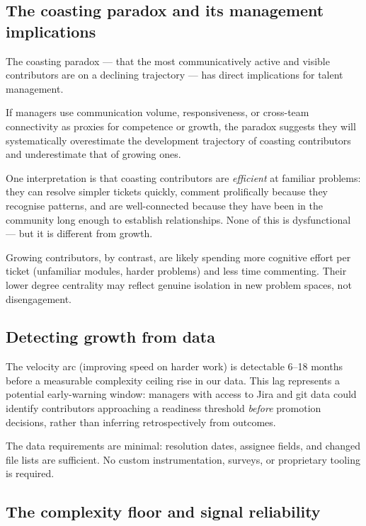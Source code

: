 \documentclass[12pt,a4paper]{article}
\begin{document}
\subsection{The coasting paradox and its management implications}

The coasting paradox --- that the most communicatively active and
visible contributors are on a declining trajectory --- has direct
implications for talent management.

If managers use communication volume, responsiveness, or
cross-team connectivity as proxies for competence or growth,
the paradox suggests they will systematically overestimate the
development trajectory of coasting contributors and underestimate
that of growing ones.

One interpretation is that coasting contributors are \textit{efficient}
at familiar problems: they can resolve simpler tickets quickly,
comment prolifically because they recognise patterns, and are
well-connected because they have been in the community long enough
to establish relationships. None of this is dysfunctional ---
but it is different from growth.

Growing contributors, by contrast, are likely spending more
cognitive effort per ticket (unfamiliar modules, harder problems)
and less time commenting. Their lower degree centrality may
reflect genuine isolation in new problem spaces, not disengagement.

\subsection{Detecting growth from data}

The velocity arc (improving speed on harder work) is detectable
6--18 months before a measurable complexity ceiling rise in our
data. This lag represents a potential early-warning window:
managers with access to Jira and git data could identify
contributors approaching a readiness threshold \textit{before}
promotion decisions, rather than inferring retrospectively from
outcomes.

The data requirements are minimal: resolution dates, assignee
fields, and changed file lists are sufficient. No custom
instrumentation, surveys, or proprietary tooling is required.

\subsection{The complexity floor and signal reliability}
\end{document}
